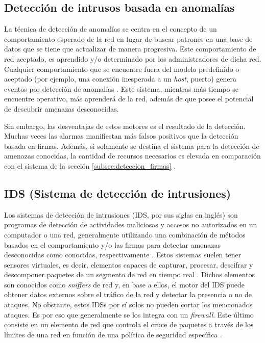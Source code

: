 \subsection {Detección de intrusos basada en anomalías}

La técnica de detección de anomalías se centra en el concepto de un
comportamiento esperado de la red en lugar de buscar patrones en una base de
datos que se tiene que actualizar de manera progresiva. Este comportamiento de red
aceptado, es aprendido y/o determinado por los administradores de dicha red.
Cualquier comportamiento que se encuentre fuera del modelo predefinido o
aceptado (por ejemplo, una conexión inesperada a un \textit{host}, puerto)
genera eventos por detección de anomalías \parencite{ddos_foster}. Este sistema,
mientras más tiempo se encuentre operativo, más aprenderá de la red, además de
que posee el potencial de descubrir amenazas desconocidas.

Sin embargo, las desventajas de estos motores es el resultado de la detección.
Muchas veces las alarmas manifiestan más falsos positivos que la detección
basada en firmas. Además, si solamente se destina el sistema para la detección
de amenazas conocidas, la cantidad de recursos necesarios es elevada en
comparación con el sistema de la sección \ref{subsec:deteccion_firmas}
\parencite{ids_vs}.


\subsection{IDS (Sistema de detección de intrusiones)}

Los sistemas de detección de intrusiones (IDS, por sus siglas en inglés) son
programas de detección de actividades maliciosas y accesos no autorizados en un
computador o una red, generalmente utilizando una combinación de métodos basados
en el comportamiento y/o las firmas para detectar amenazas desconocidas como
conocidas, respectivamente \parencite{ids_snort}. Estos sistemas suelen tener
sensores virtuales, es decir, elementos capaces de capturar, procesar, descifrar
y descomponer paquetes de un segmento de red en tiempo real
\parencite{ids_snort}. Dichos elementos son conocidos como \textit{sniffers} de
red y, en base a ellos, el motor del IDS puede obtener datos externos sobre el
tráfico de la red y detectar la presencia o no de ataques. No obstante, estos
IDSs por sí solos no pueden cortar los mencionados ataques. Es por eso que
generalmente se los integra con un \textit{firewall}. Este último consiste en un
elemento de red que controla el cruce de paquetes a través de los límites de una
red en función de una política de seguridad específica
\parencite{fwll_springer}.

